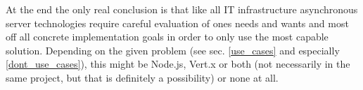 At the end the only real conclusion is that like all IT infrastructure asynchronous server technologies require careful evaluation of ones needs and wants and most off all concrete implementation goals in order to only use the most capable solution. Depending on the given problem (see sec. \ref{use_cases} and especially \ref{dont_use_cases}), this might be Node.js, Vert.x or both (not necessarily in the same project, but that is definitely a possibility) or none at all.



